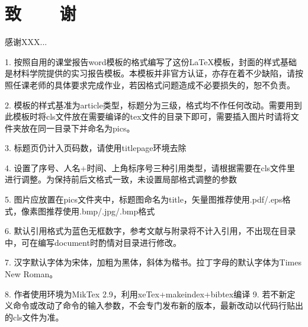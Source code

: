 ﻿\renewcommand{\baselinestretch}{1.25}
\fontsize{12.5pt}{16.25pt}\selectfont
{}
\chapter*{致~~~~谢}

感谢XXX...

1. 按照自用的课堂报告word模板的格式编写了这份LaTeX模板，封面的样式基础是材料学院提供的实习报告模板。本模板并非官方认证，亦存在着不少缺陷，请按照任课老师的具体要求完成作业，若因格式问题造成不必要损失的，恕不负责。

2. 模板的样式基准为article类型，标题分为三级，格式均不作任何改动。需要用到此模板时将cls文件放在需要编译的tex文件的目录下即可，需要插入图片时请将文件夹放在同一目录下并命名为pics。

3. 标题页仍计入页码数，请使用titlepage环境去除

4. 设置了序号、人名+时间、上角标序号三种引用类型，请根据需要在cls文件里进行调整。为保持前后文格式一致，未设置局部格式调整的参数

5. 图片应放置在pics文件夹中，标题图命名为title，矢量图推荐使用.pdf/.eps格式，像素图推荐使用.bmp/.jpg/.bmp格式

6. 默认引用格式为蓝色无框数字，参考文献与附录将不计入引用，不出现在目录中，可在编写document时酌情对目录进行修改。

7. 汉字默认字体为宋体，加粗为黑体，斜体为楷书。拉丁字母的默认字体为Times New Roman。

8. 作者使用环境为MikTex 2.9，利用xeTex+makeindex+bibtex编译
9. 若不新定义命令或改动了命令的输入参数，不会专门发布新的版本，最新改动以代码行贴出的cls文件为准。

\clearpage
\endinput